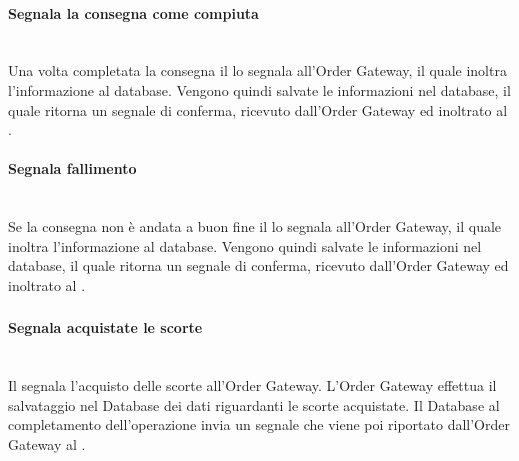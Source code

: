 \paragraph{Segnala la consegna come compiuta}\mbox{}\\
Una volta completata la consegna il \Deliveryman{} lo segnala all’Order Gateway, il quale inoltra l’informazione al database. Vengono quindi salvate le informazioni nel database, il quale ritorna un segnale di conferma, ricevuto dall’Order Gateway ed inoltrato al \Deliveryman{}.

\paragraph{Segnala fallimento}\mbox{}\\
Se la consegna non è andata a buon fine il \Deliveryman{} lo segnala all’Order Gateway, il quale inoltra l’informazione al database. Vengono quindi salvate le informazioni nel database, il quale ritorna un segnale di conferma, ricevuto dall’Order Gateway ed inoltrato al \Deliveryman{}.

\subsubsection{\Purchasingmanager{}}

\paragraph{Segnala acquistate le scorte}\mbox{}\\
Il \Purchasingmanager{} segnala l’acquisto delle scorte all’Order Gateway. L’Order Gateway effettua il salvataggio nel Database dei dati riguardanti le scorte acquistate. Il Database al completamento dell’operazione invia un segnale che viene poi riportato dall’Order Gateway al \Purchasingmanager{}.

